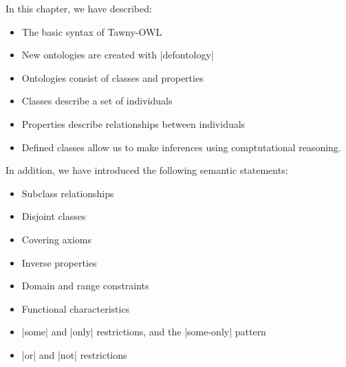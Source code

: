 In this chapter, we have described:

\begin{itemize}
\item The basic syntax of Tawny-OWL
\item New ontologies are created with |defontology|
\item Ontologies consist of classes and properties
\item Classes describe a set of individuals
\item Properties describe relationships between individuals
\item Defined classes allow us to make inferences using comptutational
  reasoning.
\end{itemize}

In addition, we have introduced the following semantic statements:
\begin{itemize}
\item Subclass relationships
\item Disjoint classes
\item Covering axioms
\item Inverse properties
\item Domain and range constraints
\item Functional characteristics
\item |some| and |only| restrictions, and the |some-only| pattern
\item |or| and |not| restrictions
\end{itemize}

